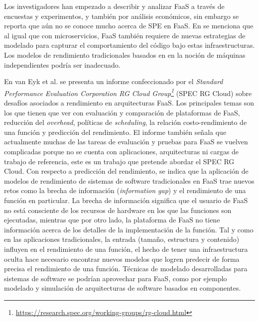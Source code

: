 Los investigadores han empezado a describir y analizar FaaS a través de encuestas y experimentos\cite{DBLP:journals/corr/BaldiniCCCFIMMR17,Crane:2017:ESA:3121050.3121086,8360324}, y también por análisis económicos\cite{7515686,8247460}, sin embargo se reporta que aún no se conoce mucho acerca de SPE en FaaS. En \cite{Heinrich:2017:PEM:3053600.3053653} se menciona que al igual que con microservicios, FaaS también requiere de nuevas estrategias de modelado para capturar el comportamiento del código bajo estas infraestructuras. Los modelos de rendimiento tradicionales basados en en la noción de máquinas independientes podría ser inadecuado. 

En van Eyk et al.\cite{vanEyk:2018:SRC:3185768.3186308} se presenta un informe confeccionado por el \emph{Standard Performance Evaluation Corporation RG Cloud Group\footnote{\url{https://research.spec.org/working-groups/rg-cloud.html}}} (SPEC RG Cloud) sobre desafíos asociados a rendimiento en arquitecturas FaaS. Los principales temas son los que tienen que ver con evaluación y comparación de plataformas de FaaS, reducción del \emph{overhead}, políticas de \emph{scheduling}, la relación costo-rendimiento de una función y predicción del rendimiento. El informe también señala que actualmente muchas de las tareas de evaluación y pruebas para FaaS se vuelven complicadas porque no se cuenta con aplicaciones, arquitecturas ni cargas de trabajo de referencia, este es un trabajo que pretende abordar el SPEC RG Cloud. Con respecto a predicción del rendimiento, se indica que la aplicación de modelos de rendimiento de sistemas de software tradicionales en FaaS trae nuevos retos como la brecha de información (\emph{information gap}) y el rendimiento de una función en particular. La brecha de información significa que el usuario de FaaS no está consciente de los recursos de hardware en los que las funciones son ejecutadas, mientras que por otro lado, la plataforma de FaaS no tiene información acerca de los detalles de la implementación de la función. Tal y como en las aplicaciones tradicionales, la entrada (tamaño, estructura y contenido) influyen en el rendimiento de una función, el hecho de tener una infraestructura oculta hace necesario encontrar nuevos modelos que logren predecir de forma precisa el rendimiento de una función. Técnicas de modelado desarrolladas para sistemas de software se podrían aprovechar para FaaS, como por ejemplo modelado y simulación de arquitecturas de software basados en componentes. 


